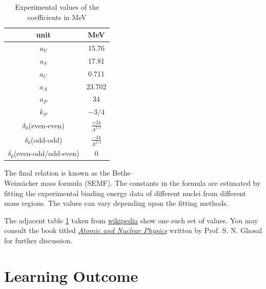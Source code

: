 \documentclass[ebook,12pt,oneside,openany]{memoir}
\begin{document}
\begin{enumerate}[label=\textbf{\Alph*.}]
            \begin{table}
                \centering
                    \begin{tabular}{||c|c||}
                    \hline
                    unit &  MeV\\
                    \hline\hline
                    $a_V$ & 15.76\\\hline
                    $a_S$ & 17.81\\\hline
                    $a_C$ & 0.711\\\hline
                    $a_A$ & 23.702\\\hline
                    $a_P$ & 34\\\hline
                    $k_P$ & ${-3/4}$\\\hline
                    $\delta_0$(even-even) & $\frac{+34}{A^{3/4}}$\\[1em]\hline
                    $\delta_0$(odd-odd) & $\frac{-34}{A^{3/4}}$\\[1em]\hline
                    $\delta_0$(even-odd/odd-even) & 0\\[1em]\hline
                    \hline
                    \end{tabular}
                \caption{Experimental values of the coefficients in MeV}
                \label{tab:table_num}
            \end{table}
            
        \hspace{3em} The final relation is known as the Bethe–\\Weizsäcker mass formula (SEMF). The constants in the formula are estimated by fitting the experimental binding energy data of different nuclei from different mass regions. The values can vary depending upon the fitting methods.\\ 
        \vspace{7em}\par The adjacent table \ref{tab:table_num} taken from \href{https://cutt.ly/VRnd6zB}{wikipedia} show one such set of values. You may consult the book titled \href{https://books.google.co.in/books?id=fkqHNMd_248C&lpg=PP1&pg=PP1#v=onepage&q&f=false}{\textit{Atomic and Nuclear Physics}} written by Prof. S. N. Ghosal for further discussion.     
        
    \end{enumerate}
    
    
    \section{Learning Outcome}
    
\end{document}

